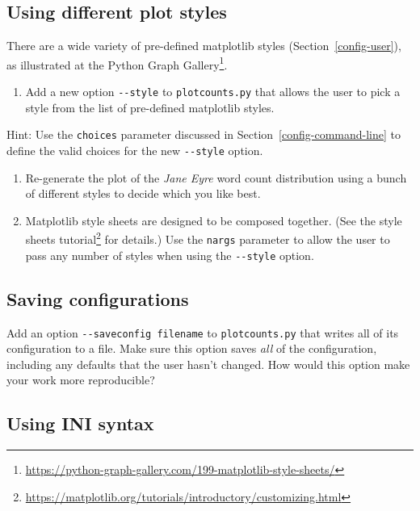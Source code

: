 \documentclass[
]{krantz}
\providecommand{\tightlist}{%
  \setlength{\itemsep}{0pt}\setlength{\parskip}{0pt}}
\renewcommand{\href}[2]{#2\footnote{\url{#1}}}
\begin{document}
\hypertarget{config-ex-style}{%
\subsection{Using different plot styles}\label{config-ex-style}}

There are a wide variety of pre-defined matplotlib styles (Section~\ref{config-user}),
as illustrated at the \href{https://python-graph-gallery.com/199-matplotlib-style-sheets/}{Python Graph Gallery}.

\begin{enumerate}
\def\labelenumi{\arabic{enumi}.}
\tightlist
\item
  Add a new option \texttt{-\/-style} to \texttt{plotcounts.py} that allows the user
  to pick a style from the list of pre-defined matplotlib styles.
\end{enumerate}

Hint: Use the \texttt{choices} parameter discussed in Section~\ref{config-command-line}
to define the valid choices for the new \texttt{-\/-style} option.

\begin{enumerate}
\def\labelenumi{\arabic{enumi}.}
\setcounter{enumi}{1}
\item
  Re-generate the plot of the \emph{Jane Eyre} word count distribution
  using a bunch of different styles to decide which you like best.
\item
  Matplotlib style sheets are designed to be composed together.
  (See the \href{https://matplotlib.org/tutorials/introductory/customizing.html}{style sheets tutorial} for details.)
  Use the \texttt{nargs} parameter to allow the user to pass any number of styles
  when using the \texttt{-\/-style} option.
\end{enumerate}

\hypertarget{config-ex-saveload}{%
\subsection{Saving configurations}\label{config-ex-saveload}}

Add an option \texttt{-\/-saveconfig\ filename} to \texttt{plotcounts.py}
that writes all of its configuration to a file.
Make sure this option saves \emph{all} of the configuration,
including any defaults that the user hasn't changed.
How would this option make your work more reproducible?

\hypertarget{config-ex-ini}{%
\subsection{Using INI syntax}\label{config-ex-ini}}
\end{document}
